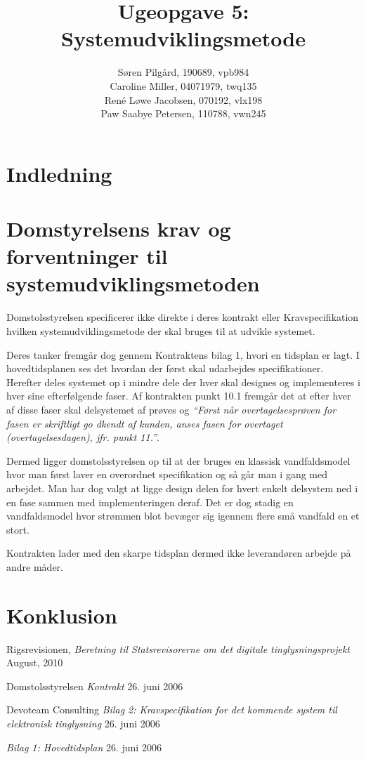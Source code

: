 \documentclass[10pt,a4paper,danish]{article}
\title{Ugeopgave 5: Systemudviklingsmetode}
\author{Søren Pilgård, 190689, vpb984\\
Caroline Miller, 04071979, twq135\\
René Løwe Jacobsen, 070192, vlx198\\
Paw Saabye Petersen, 110788, vwn245}
\begin{document}
\maketitle
\newpage


\section{Indledning}



\section{Domstyrelsens krav og forventninger til systemudviklingsmetoden}
Domstolsstyrelsen specificerer ikke direkte i deres kontrakt\cite{Kontrakt}
eller Kravspecifikation\cite{Krav} hvilken systemudviklingsmetode der skal
bruges til at udvikle systemet.

Deres tanker fremgår dog gennem Kontraktens bilag 1\cite{Tid}, hvori en tidsplan
er lagt.
I hovedtidsplanen ses det hvordan der først skal udarbejdes specifikationer.
Herefter deles systemet op i mindre dele der hver skal designes og implementeres
i hver sine efterfølgende faser. Af kontrakten punkt 10.1
fremgår det at efter hver af disse faser skal delsystemet af prøves og \textit{``Først når overtagelsesprøven for fasen er skriftligt go dkendt af kunden, anses
  fasen for overtaget (overtagelsesdagen), jfr. punkt 11.''}\cite[s.~16]{Kontrakt}.

Dermed ligger domstolsstyrelsen op til at der bruges en klassisk vandfaldsmodel
hvor man først laver en overordnet specifikation og så går man i gang med
arbejdet. Man har dog valgt at ligge design delen for hvert enkelt delsystem ned
i en fase sammen med implementeringen deraf. Det er dog stadig en vandfaldsmodel
hvor strømmen blot bevæger sig igennem flere små vandfald en et stort.


Kontrakten lader med den skarpe tidsplan dermed ikke leverandøren arbejde på
andre måder.


\section{Konklusion}


\begin{thebibliography}{9}

  Rigsrevisionen,
  \emph{Beretning til Statsrevisorerne om det digitale
  tinglysningsprojekt}
  August, 2010

Domstolsstyrelsen
  \emph{Kontrakt}
  26. juni 2006

  Devoteam Consulting
  \emph{Bilag 2: Kravspecifikation for det kommende
  system til elektronisk tinglysning}
  26. juni 2006

  \emph{Bilag 1: Hovedtidsplan}
  26. juni 2006

\end{thebibliography}
\end{document}
